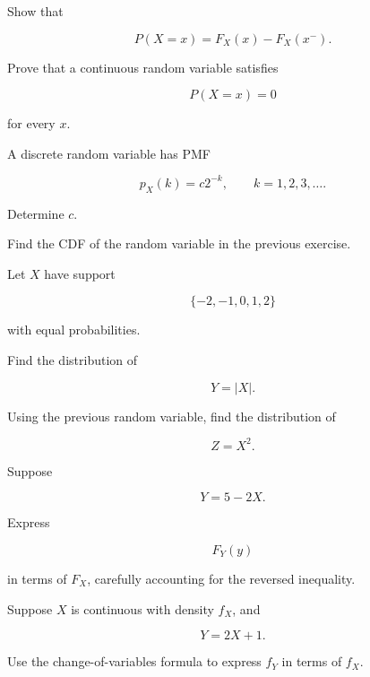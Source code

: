 \begin{exercise}[3]
Show that

\[
P(X=x)
=
F_X(x)-F_X(x^-).
\]
\end{exercise}

\begin{exercise}[3]
Prove that a continuous random variable satisfies

\[
P(X=x)=0
\]

for every \(x\).
\end{exercise}

\begin{exercise}[3]
A discrete random variable has PMF

\[
p_X(k)=c2^{-k},
\qquad
k=1,2,3,\ldots.
\]

Determine \(c\).
\end{exercise}

\begin{exercise}[3]
Find the CDF of the random variable in the previous exercise.
\end{exercise}

\begin{exercise}[3]
Let \(X\) have support

\[
\{-2,-1,0,1,2\}
\]

with equal probabilities.

Find the distribution of

\[
Y=|X|.
\]
\end{exercise}

\begin{exercise}[3]
Using the previous random variable, find the distribution of

\[
Z=X^2.
\]
\end{exercise}

\begin{exercise}[3]
Suppose

\[
Y=5-2X.
\]

Express

\[
F_Y(y)
\]

in terms of \(F_X\), carefully accounting for the reversed inequality.
\end{exercise}

\begin{exercise}[3]
Suppose \(X\) is continuous with density \(f_X\), and

\[
Y=2X+1.
\]

Use the change-of-variables formula to express \(f_Y\) in terms of
\(f_X\).
\end{exercise}

